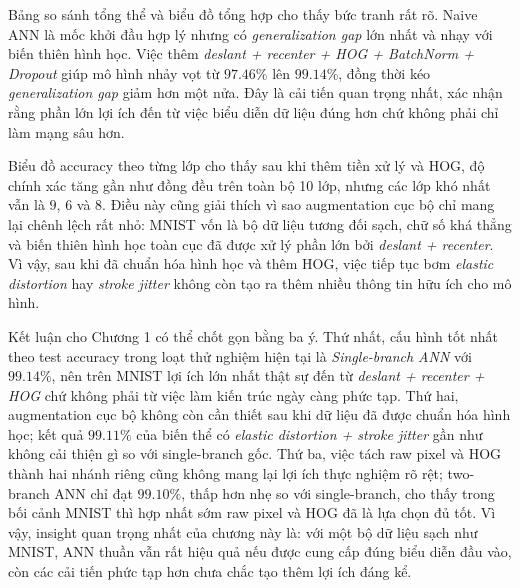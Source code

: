 Bảng so sánh tổng thể và biểu đồ tổng hợp cho thấy bức tranh rất rõ. Naive ANN là mốc khởi đầu hợp lý nhưng có \textit{generalization gap} lớn nhất và nhạy với biến thiên hình học. Việc thêm \textit{deslant + recenter + HOG + BatchNorm + Dropout} giúp mô hình nhảy vọt từ $97.46\%$ lên $99.14\%$, đồng thời kéo \textit{generalization gap} giảm hơn một nửa. Đây là cải tiến quan trọng nhất, xác nhận rằng phần lớn lợi ích đến từ việc biểu diễn dữ liệu đúng hơn chứ không phải chỉ làm mạng sâu hơn.

Biểu đồ accuracy theo từng lớp cho thấy sau khi thêm tiền xử lý và HOG, độ chính xác tăng gần như đồng đều trên toàn bộ 10 lớp, nhưng các lớp khó nhất vẫn là $9$, $6$ và $8$. Điều này cũng giải thích vì sao augmentation cục bộ chỉ mang lại chênh lệch rất nhỏ: MNIST vốn là bộ dữ liệu tương đối sạch, chữ số khá thẳng và biến thiên hình học toàn cục đã được xử lý phần lớn bởi \textit{deslant + recenter}. Vì vậy, sau khi đã chuẩn hóa hình học và thêm HOG, việc tiếp tục bơm \textit{elastic distortion} hay \textit{stroke jitter} không còn tạo ra thêm nhiều thông tin hữu ích cho mô hình.

Kết luận cho Chương 1 có thể chốt gọn bằng ba ý. Thứ nhất, cấu hình tốt nhất theo test accuracy trong loạt thử nghiệm hiện tại là \textit{Single-branch ANN} với $99.14\%$, nên trên MNIST lợi ích lớn nhất thật sự đến từ \textit{deslant + recenter + HOG} chứ không phải từ việc làm kiến trúc ngày càng phức tạp. Thứ hai, augmentation cục bộ không còn cần thiết sau khi dữ liệu đã được chuẩn hóa hình học; kết quả $99.11\%$ của biến thể có \textit{elastic distortion + stroke jitter} gần như không cải thiện gì so với single-branch gốc. Thứ ba, việc tách raw pixel và HOG thành hai nhánh riêng cũng không mang lại lợi ích thực nghiệm rõ rệt; two-branch ANN chỉ đạt $99.10\%$, thấp hơn nhẹ so với single-branch, cho thấy trong bối cảnh MNIST thì hợp nhất sớm raw pixel và HOG đã là lựa chọn đủ tốt. Vì vậy, insight quan trọng nhất của chương này là: với một bộ dữ liệu sạch như MNIST, ANN thuần vẫn rất hiệu quả nếu được cung cấp đúng biểu diễn đầu vào, còn các cải tiến phức tạp hơn chưa chắc tạo thêm lợi ích đáng kể.
